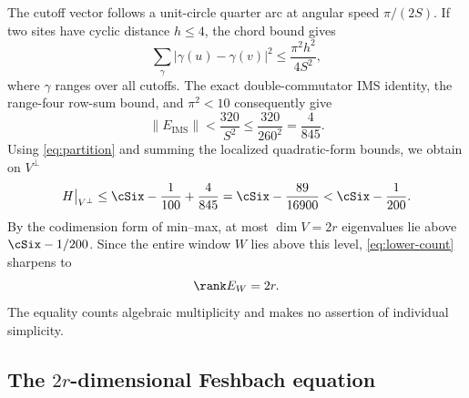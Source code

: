 The cutoff vector follows a unit-circle quarter arc at angular speed
\(\pi/(2S)\).  If two sites have cyclic distance \(h\leq4\), the chord bound
gives
\[
 \sum_\gamma|\gamma(u)-\gamma(v)|^2
 \leq\frac{\pi^2h^2}{4S^2},
\]
where \(\gamma\) ranges over all cutoffs.  The exact double-commutator IMS
identity, the range-four row-sum bound, and \(\pi^2<10\) consequently give
\begin{equation}
 \|E_{\mathrm{IMS}}\|<\frac{320}{S^2}
 \leq\frac{320}{260^2}=\frac4{845}.
 \label{eq:ims}
\end{equation}
Using \eqref{eq:partition} and summing the localized quadratic-form bounds,
we obtain on \(V^\perp\)
\begin{equation}
 H\big|_{V^\perp}
 \leq\cSix-\frac1{100}+\frac4{845}
 =\cSix-\frac{89}{16900}
 <\cSix-\frac1{200}.
 \label{eq:complement-finite}
\end{equation}
By the codimension form of min--max, at most \(\dim V=2r\) eigenvalues lie
above \(\cSix-1/200\).  Since the entire window \(W\) lies above this
level, \eqref{eq:lower-count} sharpens to
\begin{equation}
 \rank E_W=2r.
 \label{eq:exact-count}
\end{equation}
The equality counts algebraic multiplicity and makes no assertion of
individual simplicity.

\subsection{The \texorpdfstring{\(2r\)}{2r}-dimensional Feshbach equation}

